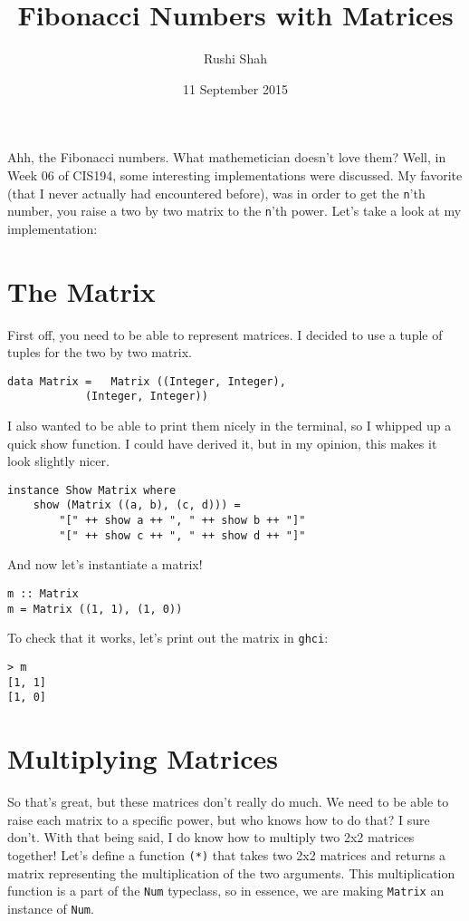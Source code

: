 \documentclass[12pt]{article}
\title{Fibonacci Numbers with Matrices}
\author{Rushi Shah}
\date{11 September 2015}
\begin{document}
	\maketitle

	Ahh, the Fibonacci numbers. What mathemetician doesn't love them? Well, in Week 06 of CIS194, some interesting implementations were discussed. My favorite (that I never actually had encountered before), was in order to get the \texttt{n}'th number, you raise a two by two matrix to the \texttt{n}'th power. Let's take a look at my implementation:

	\section{The Matrix}\label{the-matrix}

	First off, you need to be able to represent matrices. I decided to use a
	tuple of tuples for the two by two matrix.

	\begin{lstlisting}
data Matrix = 	Matrix ((Integer, Integer),
			(Integer, Integer)) 
	\end{lstlisting}

	I also wanted to be able to print them nicely in the terminal, so I
	whipped up a quick show function. I could have derived it, but in my
	opinion, this makes it look slightly nicer.

	\begin{lstlisting}
instance Show Matrix where 
	show (Matrix ((a, b), (c, d))) = 
		"[" ++ show a ++ ", " ++ show b ++ "]"
		"[" ++ show c ++ ", " ++ show d ++ "]"
	\end{lstlisting}

	And now let's instantiate a matrix!

	\begin{lstlisting}
m :: Matrix 
m = Matrix ((1, 1), (1, 0)) 
	\end{lstlisting}

	To check that it works, let's print out the matrix in \texttt{ghci}:

	\begin{lstlisting}
> m
[1, 1]
[1, 0] 
	\end{lstlisting}

	\section{Multiplying Matrices}\label{multiplying-matrices}

	So that's great, but these matrices don't really do much. We need to be
	able to raise each matrix to a specific power, but who knows how to do
	that? I sure don't. With that being said, I do know how to multiply two
	2x2 matrices together! Let's define a function \texttt{(*)} that takes
	two 2x2 matrices and returns a matrix representing the multiplication of
	the two arguments. This multiplication function is a part of the
	\texttt{Num} typeclass, so in essence, we are making \texttt{Matrix} an
	instance of \texttt{Num}.
\end{document}
